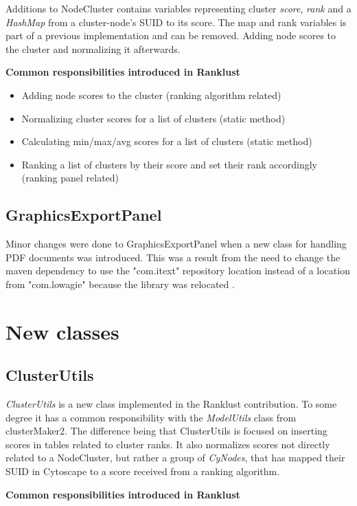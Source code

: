 Additions to NodeCluster contains variables representing cluster \textit{score},
\textit{rank} and a \textit{HashMap} from a cluster-node's SUID to its score.
The map and rank variables is part of a previous implementation and can be
removed. Adding node scores to the cluster and normalizing it afterwards.

\textbf{Common responsibilities introduced in Ranklust}

\begin{itemize}
    \item Adding node scores to the cluster (ranking algorithm related)
    \item Normalizing cluster scores for a list of clusters (static method)
    \item Calculating min/max/avg scores for a list of clusters (static method)
    \item Ranking a list of clusters by their score and set their rank
        accordingly (ranking panel related)
\end{itemize}

\subsection{GraphicsExportPanel}
Minor changes were done to GraphicsExportPanel when a new class for handling PDF
documents was introduced. This was a result from the need to change the maven
dependency to use the "com.itext"\cite{itext} repository location instead of
a location from "com.lowagie" because the library was relocated
\cite{lowagie-to-itext}.

\section{New classes}
\subsection{ClusterUtils}
\textit{ClusterUtils} is a new class implemented in the Ranklust contribution.
To some degree it has a common responsibility with the \textit{ModelUtils} class
from clusterMaker2. The difference being that ClusterUtils is focused on
inserting scores in tables related to cluster ranks. It also normalizes scores
not directly related to a NodeCluster, but rather a group of \textit{CyNodes},
that has mapped their SUID in Cytoscape to a score received from a ranking
algorithm.

\textbf{Common responsibilities introduced in Ranklust}

